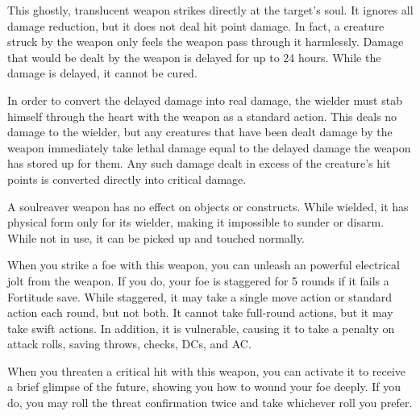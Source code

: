 
 This ghostly, translucent weapon strikes directly at the target's soul. It ignores all damage reduction, but it does not deal hit point damage. In fact, a creature struck by the weapon only feels the weapon pass through it harmlessly. Damage that would be dealt by the weapon is delayed for up to 24 hours. While the damage is delayed, it cannot be cured.

In order to convert the delayed damage into real damage, the wielder must stab himself through the heart with the weapon as a standard action. This deals no damage to the wielder, but any creatures that have been dealt damage by the weapon immediately take lethal damage equal to the delayed damage the weapon has stored up for them. Any such damage dealt in excess of the creature's hit points is converted directly into critical damage.

A soulreaver weapon has no effect on objects or constructs. While wielded, it has physical form only for its wielder, making it impossible to sunder or disarm. While not in use, it can be picked up and touched normally.


 When you strike a foe with this weapon, you can unleash an powerful electrical jolt from the weapon. If you do, your foe is staggered for 5 rounds if it fails a Fortitude save. While staggered, it may take a single move action or standard action each round, but not both. It cannot take full-round actions, but it may take swift actions. In addition, it is vulnerable, causing it to take a  penalty on attack rolls, saving throws, checks, DCs, and AC.


 When you threaten a critical hit with this weapon, you can activate it to receive a brief glimpse of the future, showing you how to wound your foe deeply. If you do, you may roll the threat confirmation twice and take whichever roll you prefer.

